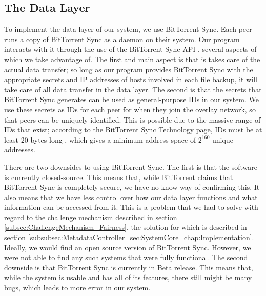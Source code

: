 \documentclass[12pt]{report}
\begin{document}
\subsection{The Data Layer}
To implement the data layer of our system, we use BitTorrent Sync. Each peer runs a copy of BitTorrent Sync as a daemon on their system. Our program interacts with it through the use of the BitTorrent Sync API \cite{btsyncapi}, several aspects of which we take advantage of. The first and main aspect is that is takes care of the actual data transfer; so long as our program provides BitTorrent Sync with the appropriate secrets and IP addresses of hosts involved in each file backup, it will take care of all data transfer in the data layer. The second is that the secrets that BitTorrent Sync generates can be used as general-purpose IDs in our system. We use these secrets as IDs for each peer for when they join the overlay network, so that peers can be uniquely identified. This is possible due to the massive range of IDs that exist; according to the BitTorrent Sync Technology page, IDs must be at least 20 bytes long \cite{btsynctech}, which gives a minimum address space of $2^{160}$ unique addresses.

There are two downsides to using BitTorrent Sync. The first is that the software is currently closed-source. This means that, while BitTorrent claims that BitTorrent Sync is completely secure, we have no know way of confirming this. It also means that we have less control over how our data layer functions and what information can be accessed from it. This is a problem that we had to solve with regard to the challenge mechanism described in section \ref{subsec:ChallengeMechanism_Fairness}, the solution for which is described in section \ref{subsubsec:MetadataController_sec:SystemCore_chap:Implementation}. Ideally, we would find an open source version of BitTorrent Sync. However, we were not able to find any such systems that were fully functional. The second downside is that BitTorrent Sync is currently in Beta release. This means that, while the system is usable and has all of its features, there still might be many bugs, which leads to more error in our system.
\end{document}
